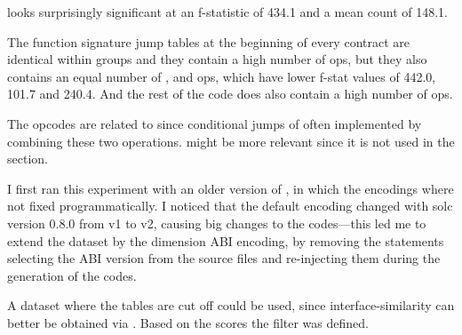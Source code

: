 \documentclass[../main.tex]{subfiles}
\begin{document}
 looks surprisingly significant at an f-statistic of 434.1 and a mean count of 148.1.

The  function signature jump tables at the beginning of every contract are identical within groups and they contain a high number of  ops, but they also contains an equal number of ,  and  ops, which have lower f-stat values of 442.0, 101.7 and 240.4. And the rest of the code does also contain a high number of  ops.

The  opcodes are related to  since conditional jumps of often implemented by combining these two operations.  might be more relevant since it is not used in the  section.

I first ran this experiment with an older version of \n{\solcts}, in which the  encodings where not fixed programmatically. I noticed that the default encoding changed with solc version 0.8.0 from v1 to v2, causing big changes to the codes---this led me to extend the dataset by the dimension ABI encoding, by removing the  statements selecting the ABI version from the source files and re-injecting them during the generation of the codes.

A dataset where the  tables are cut off could be used, since interface-similarity can better be obtained via  .
Based on the scores the   filter was defined.
\end{document}
